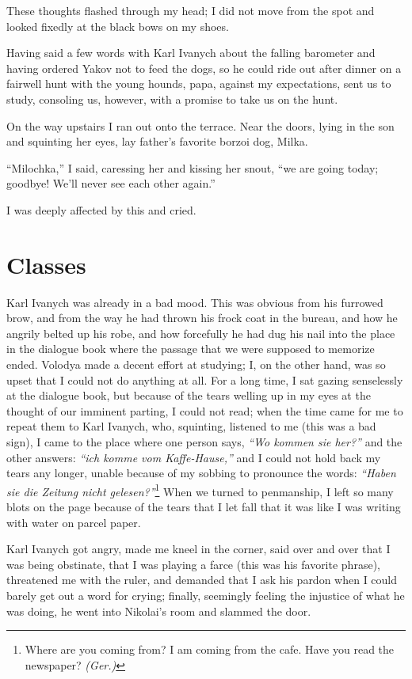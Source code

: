 These thoughts flashed through my head; I did not move from the spot and looked fixedly at the black bows on my shoes.

Having said a few words with Karl Ivanych about the falling barometer and having ordered Yakov not to feed the dogs, so he could ride out after dinner on a fairwell hunt with the young hounds, papa, against my expectations, sent us to study, consoling us, however, with a promise to take us on the hunt.

On the way upstairs I ran out onto the terrace. Near the doors, lying in the son and squinting her eyes, lay father's favorite borzoi dog, Milka.

``Milochka,'' I said, caressing her and kissing her snout, ``we are going today; goodbye! We'll never see each other again.'' %

I was deeply affected by this and cried.

\chapter{Classes} %

Karl Ivanych was already in a bad mood. This was obvious from his furrowed brow, and from the way he had thrown his frock coat in the bureau,  and how he angrily belted up his robe, and how forcefully he had dug his nail into the place in the dialogue book where the passage that we were supposed to memorize ended. Volodya made a decent effort at studying; I, on the other hand, was so upset that I could not do anything at all. For a long time, I sat gazing senselessly at the dialogue book, but because of the tears welling up in my eyes at the thought of our imminent parting, I could not read; when the time came for me to repeat them to Karl Ivanych, who, squinting, listened to me (this was a bad sign), I came to the place where one person says, \textit{``Wo kommen sie her?''} and the other answers: \textit{``ich komme vom Kaffe-Hause,''} and I could not hold back my tears any longer, unable because of my sobbing to pronounce the words: \textit{``Haben sie die Zeitung nicht gelesen?''}\footnote{Where are you coming from? I am coming from the cafe. Have you read the newspaper? \textit{(Ger.)}} When we turned to penmanship, I left so many blots on the page because of the tears that I let fall that it was like I was writing with water on parcel paper.

Karl Ivanych got angry, made me kneel in the corner, said over and over that I was being obstinate, that I was playing a farce (this was his favorite phrase), threatened me with the ruler, and demanded that I ask his pardon when I could barely get out a word for crying; finally, seemingly feeling the injustice of what he was doing, he went into Nikolai's room and slammed the door.

